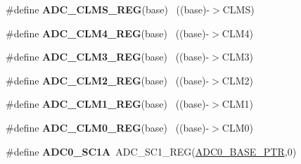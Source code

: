 \begin{DoxyCompactItemize}
\item 
\hypertarget{group___a_d_c___register___accessor___macros_gaebae30a3ca641d11bf4827c16cf97f40}{}\#define {\bfseries A\+D\+C\+\_\+\+C\+L\+M\+S\+\_\+\+R\+E\+G}(base)                                          ~((base)-\/$>$C\+L\+M\+S)\label{group___a_d_c___register___accessor___macros_gaebae30a3ca641d11bf4827c16cf97f40}

\item 
\hypertarget{group___a_d_c___register___accessor___macros_ga9c3a854d793a88e2311f1f03b687e3e0}{}\#define {\bfseries A\+D\+C\+\_\+\+C\+L\+M4\+\_\+\+R\+E\+G}(base)                                          ~((base)-\/$>$C\+L\+M4)\label{group___a_d_c___register___accessor___macros_ga9c3a854d793a88e2311f1f03b687e3e0}

\item 
\hypertarget{group___a_d_c___register___accessor___macros_ga97002f7666f0790f47fc6bd12a083246}{}\#define {\bfseries A\+D\+C\+\_\+\+C\+L\+M3\+\_\+\+R\+E\+G}(base)                                          ~((base)-\/$>$C\+L\+M3)\label{group___a_d_c___register___accessor___macros_ga97002f7666f0790f47fc6bd12a083246}

\item 
\hypertarget{group___a_d_c___register___accessor___macros_ga46547eb78fef1573713d39b1d8c578d5}{}\#define {\bfseries A\+D\+C\+\_\+\+C\+L\+M2\+\_\+\+R\+E\+G}(base)                                          ~((base)-\/$>$C\+L\+M2)\label{group___a_d_c___register___accessor___macros_ga46547eb78fef1573713d39b1d8c578d5}

\item 
\hypertarget{group___a_d_c___register___accessor___macros_gac5ca17b6333853551a5367159766f482}{}\#define {\bfseries A\+D\+C\+\_\+\+C\+L\+M1\+\_\+\+R\+E\+G}(base)                                          ~((base)-\/$>$C\+L\+M1)\label{group___a_d_c___register___accessor___macros_gac5ca17b6333853551a5367159766f482}

\item 
\hypertarget{group___a_d_c___register___accessor___macros_ga8d8e7a000934e8d6f37a0e6f8175de9e}{}\#define {\bfseries A\+D\+C\+\_\+\+C\+L\+M0\+\_\+\+R\+E\+G}(base)                                          ~((base)-\/$>$C\+L\+M0)\label{group___a_d_c___register___accessor___macros_ga8d8e7a000934e8d6f37a0e6f8175de9e}

\item 
\hypertarget{group___a_d_c___register___accessor___macros_ga4ec61cea717b410cadc80c71f4c81664}{}\#define {\bfseries A\+D\+C0\+\_\+\+S\+C1\+A}~A\+D\+C\+\_\+\+S\+C1\+\_\+\+R\+E\+G(\hyperlink{group___a_d_c___peripheral_ga6cec2f227a3a37a9fccaa830740f1f5e}{A\+D\+C0\+\_\+\+B\+A\+S\+E\+\_\+\+P\+T\+R},0)\label{group___a_d_c___register___accessor___macros_ga4ec61cea717b410cadc80c71f4c81664}


\end{DoxyCompactItemize}
